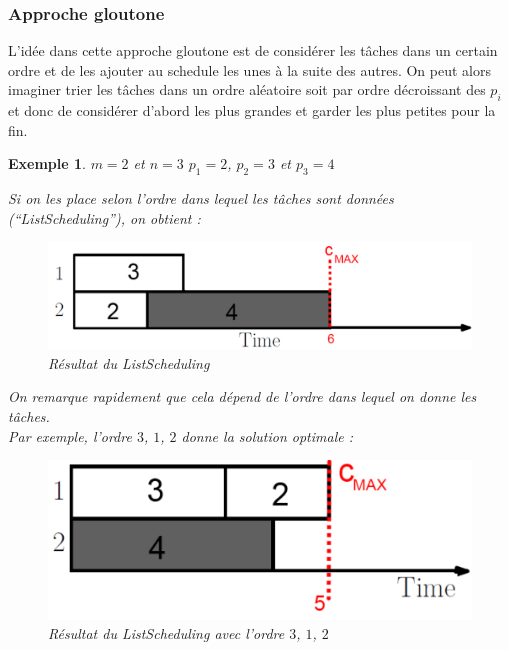 \documentclass[12pt]{article}
\newtheorem{exemple}{Exemple}[section]
\begin{document}
\subsubsection{Approche gloutone}

L'idée dans cette approche gloutone est de considérer les tâches dans un certain ordre et de les ajouter au schedule les unes à la suite
des autres. On peut alors imaginer trier les tâches dans un ordre aléatoire soit par ordre décroissant des $p_i$ et donc de considérer
d'abord les plus grandes et garder les plus petites pour la fin.

\begin{exemple}$m=2$ et $n=3$
$p_1 = 2$, $p_2 = 3$ et $p_3=4$

Si on les place selon l'ordre dans lequel les tâches sont données \textit{(``ListScheduling'')}, on obtient :

\begin{figure}[h!]
    \begin{center}
    \includegraphics[scale=0.3]{spm5.pdf}
    \caption{Résultat du ListScheduling}
    \end{center}
\end{figure}

On remarque rapidement que cela dépend de l'ordre dans lequel on donne les tâches.  \\ Par exemple, l'ordre $3$, $1$, $2$ donne la solution
optimale :

\begin{figure}[h!]
    \begin{center}
    \includegraphics[scale=0.3]{spm6.pdf}
    \caption{Résultat du ListScheduling avec l'ordre $3$, $1$, $2$}
    \end{center}
\end{figure}

\end{exemple}
\end{document}
